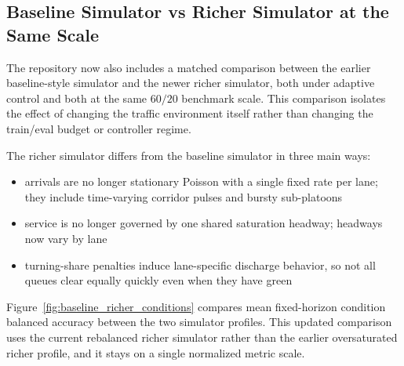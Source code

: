 \documentclass[11pt]{article}
\begin{document}
\subsection{Baseline Simulator vs Richer Simulator at the Same Scale}

The repository now also includes a matched comparison between the earlier baseline-style simulator and the newer richer simulator, both under adaptive control and both at the same \(60/20\) benchmark scale. This comparison isolates the effect of changing the traffic environment itself rather than changing the train/eval budget or controller regime.

The richer simulator differs from the baseline simulator in three main ways:
\begin{itemize}
  \item arrivals are no longer stationary Poisson with a single fixed rate per lane; they include time-varying corridor pulses and bursty sub-platoons
  \item service is no longer governed by one shared saturation headway; headways now vary by lane
  \item turning-share penalties induce lane-specific discharge behavior, so not all queues clear equally quickly even when they have green
\end{itemize}

Figure~\ref{fig:baseline_richer_conditions} compares mean fixed-horizon condition balanced accuracy between the two simulator profiles. This updated comparison uses the current rebalanced richer simulator rather than the earlier oversaturated richer profile, and it stays on a single normalized metric scale.
\end{document}
